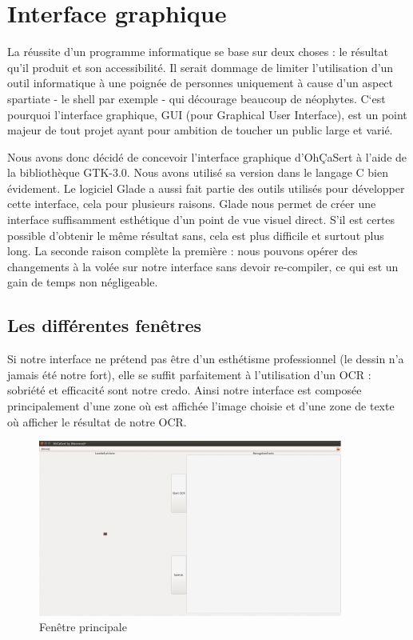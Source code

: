 \documentclass[11pt]{report}
\begin{document}
\chapter{Interface graphique}

La réussite d’un programme informatique se base sur deux choses : le résultat qu’il produit et son accessibilité. Il serait dommage de limiter l’utilisation d’un outil informatique à une poignée de personnes uniquement à cause d’un aspect spartiate - le shell par exemple - qui décourage beaucoup de néophytes. C‘est pourquoi l’interface graphique, GUI (pour Graphical User Interface), est un point majeur de tout projet ayant pour ambition de toucher un public large et varié.

Nous avons donc décidé de concevoir l’interface graphique d’OhÇaSert à l’aide de la bibliothèque GTK-3.0. Nous avons utilisé sa version dans le langage C bien évidement. Le logiciel Glade a aussi fait partie des outils utilisés pour développer cette interface, cela pour plusieurs raisons. Glade nous permet de créer une interface suffisamment esthétique d’un point de vue visuel direct. S’il est certes possible d’obtenir le même résultat sans, cela est plus difficile et surtout plus long. La seconde raison complète la première : nous pouvons opérer des changements à la volée sur notre interface sans devoir re-compiler, ce qui est un gain de temps non négligeable.

\section{Les différentes fenêtres}

Si notre interface ne prétend pas être d’un esthétisme professionnel (le dessin n’a jamais été notre fort), elle se suffit parfaitement à l’utilisation d’un OCR : sobriété et efficacité sont notre credo. Ainsi notre interface est composée principalement d’une zone où est affichée l’image choisie et d’une zone de texte où afficher le résultat de notre OCR.

\begin{figure}[htbp]
\centering
\includegraphics[width=10cm]{gui.png}
\caption{Fenêtre principale}
\end{figure}
\end{document}
